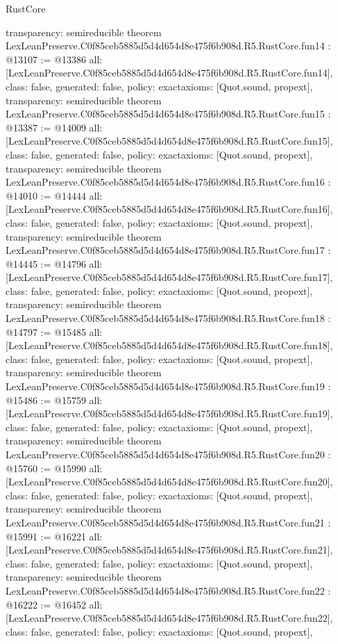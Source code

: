 \begin{lexlean}{RustCore}
\begin{coremodule}
{  transparency: semireducible
}
theorem LexLeanPreserve.C0f85ceb5885d5d4d654d8e475f6b908d.R5.RustCore.fun14 : @13107 := @13386 {
  all: [LexLeanPreserve.C0f85ceb5885d5d4d654d8e475f6b908d.R5.RustCore.fun14],
  class: false,
  generated: false,
  policy: exact{axioms: [Quot.sound, propext]},
  transparency: semireducible
}
theorem LexLeanPreserve.C0f85ceb5885d5d4d654d8e475f6b908d.R5.RustCore.fun15 : @13387 := @14009 {
  all: [LexLeanPreserve.C0f85ceb5885d5d4d654d8e475f6b908d.R5.RustCore.fun15],
  class: false,
  generated: false,
  policy: exact{axioms: [Quot.sound, propext]},
  transparency: semireducible
}
theorem LexLeanPreserve.C0f85ceb5885d5d4d654d8e475f6b908d.R5.RustCore.fun16 : @14010 := @14444 {
  all: [LexLeanPreserve.C0f85ceb5885d5d4d654d8e475f6b908d.R5.RustCore.fun16],
  class: false,
  generated: false,
  policy: exact{axioms: [Quot.sound, propext]},
  transparency: semireducible
}
theorem LexLeanPreserve.C0f85ceb5885d5d4d654d8e475f6b908d.R5.RustCore.fun17 : @14445 := @14796 {
  all: [LexLeanPreserve.C0f85ceb5885d5d4d654d8e475f6b908d.R5.RustCore.fun17],
  class: false,
  generated: false,
  policy: exact{axioms: [Quot.sound, propext]},
  transparency: semireducible
}
theorem LexLeanPreserve.C0f85ceb5885d5d4d654d8e475f6b908d.R5.RustCore.fun18 : @14797 := @15485 {
  all: [LexLeanPreserve.C0f85ceb5885d5d4d654d8e475f6b908d.R5.RustCore.fun18],
  class: false,
  generated: false,
  policy: exact{axioms: [Quot.sound, propext]},
  transparency: semireducible
}
theorem LexLeanPreserve.C0f85ceb5885d5d4d654d8e475f6b908d.R5.RustCore.fun19 : @15486 := @15759 {
  all: [LexLeanPreserve.C0f85ceb5885d5d4d654d8e475f6b908d.R5.RustCore.fun19],
  class: false,
  generated: false,
  policy: exact{axioms: [Quot.sound, propext]},
  transparency: semireducible
}
theorem LexLeanPreserve.C0f85ceb5885d5d4d654d8e475f6b908d.R5.RustCore.fun20 : @15760 := @15990 {
  all: [LexLeanPreserve.C0f85ceb5885d5d4d654d8e475f6b908d.R5.RustCore.fun20],
  class: false,
  generated: false,
  policy: exact{axioms: [Quot.sound, propext]},
  transparency: semireducible
}
theorem LexLeanPreserve.C0f85ceb5885d5d4d654d8e475f6b908d.R5.RustCore.fun21 : @15991 := @16221 {
  all: [LexLeanPreserve.C0f85ceb5885d5d4d654d8e475f6b908d.R5.RustCore.fun21],
  class: false,
  generated: false,
  policy: exact{axioms: [Quot.sound, propext]},
  transparency: semireducible
}
theorem LexLeanPreserve.C0f85ceb5885d5d4d654d8e475f6b908d.R5.RustCore.fun22 : @16222 := @16452 {
  all: [LexLeanPreserve.C0f85ceb5885d5d4d654d8e475f6b908d.R5.RustCore.fun22],
  class: false,
  generated: false,
  policy: exact{axioms: [Quot.sound, propext]},
}
\end{coremodule}
\end{lexlean}
